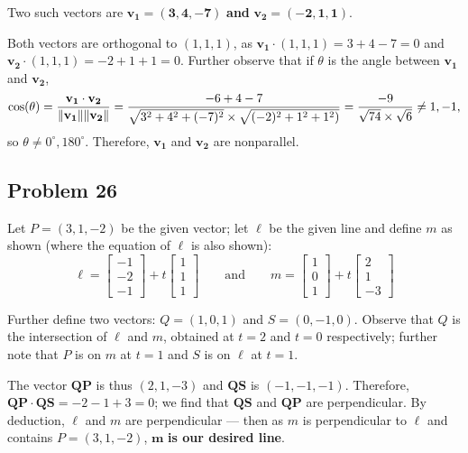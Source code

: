 \documentclass[11pt]{article}
\renewcommand{\vec}[1]{\mathbf{#1}}
\begin{document}
Two such vectors are $\mathbf{\vec{v_{1}} = (3, 4, -7)}$ \textbf{and} $\mathbf{\vec{v_{2}} = (-2, 1, 1)}$.
	
Both vectors are orthogonal to $(1, 1, 1)$, as $\vec{v_{1}} \cdot (1, 1, 1) = 3 + 4 - 7 = 0$ and $\vec{v_{2}} \cdot (1, 1, 1) = -2 + 1 + 1 = 0$. Further observe that if $\theta$ is the angle between $\vec{v_{1}}$ and $\vec{v_{2}}$, 
\[ 
	\cos (\theta) = \frac{\vec{v_{1}} \cdot \vec{v_{2}}}{\norm{\vec{v_{1}}} \norm{\vec{v_{2}}}} = \frac{-6 + 4 - 7}{\sqrt{3^2 + 4^2 + (-7)^2} \times \sqrt{(-2)^2 + 1^2 + 1^2)}} = \frac{-9}{\sqrt{74} \times \sqrt{6}} \ne 1, -1,
\]
so $\theta \ne 0^{\circ}, 180^{\circ}$. Therefore, $\vec{v_{1}}$ and $\vec{v_{2}}$ are nonparallel.

\subsection*{Problem 26}

Let $P = (3, 1, -2)$ be the given vector; let $\ell$ be the given line and define $m$ as shown (where the equation of $\ell$ is also shown):
\[ 
	\ell = \begin{bmatrix} -1 \\ -2 \\ -1 \end{bmatrix} + t \begin{bmatrix} 1 \\ 1 \\ 1 \end{bmatrix} \qquad \text{and} \qquad  m = \begin{bmatrix} 1 \\ 0 \\ 1 \end{bmatrix} + t \begin{bmatrix} 2 \\ 1 \\ -3 \end{bmatrix}
\]

Further define two vectors: $Q = (1, 0, 1)$ and $S = (0, -1, 0)$. Observe that $Q$ is the intersection of $\ell$ and $m$, obtained at $t = 2$ and $t = 0$ respectively; further note that $P$ is on $m$ at $t = 1$ and $S$ is on $\ell$ at $t = 1$.

The vector $\vec{QP}$ is thus $(2, 1, -3)$ and $\vec{QS}$ is $(-1, -1, -1)$. Therefore, $\vec{QP} \cdot \vec{QS} = -2 - 1 + 3 = 0$; we find that $\vec{QS}$ and $\vec{QP}$ are perpendicular. By deduction, $\ell$ and $m$ are perpendicular --- then as $m$ is perpendicular to $\ell$ and contains $P = (3, 1, -2)$, $\mathbf{m}$ \textbf{is our desired line}.
\end{document}
